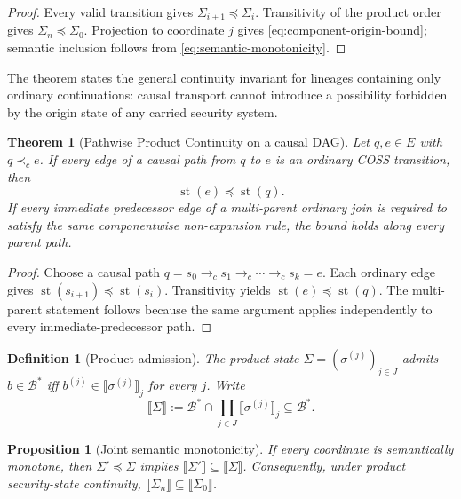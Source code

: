 \documentclass[10pt,twocolumn]{article}
\newcommand{\Model}{\textnormal{\textsc{COSS}}\xspace}
\newcommand{\sem}[1]{\llbracket #1 \rrbracket}
\newcommand{\state}{\Sigma}
\newcommand{\coord}{\sigma}
\newcommand{\st}{\operatorname{st}}
\newcommand{\hb}{\prec_{c}}
\newtheorem{definition}{Definition}
\newtheorem{theorem}{Theorem}
\newtheorem{proposition}{Proposition}
\begin{document}
\begin{proof}
Every valid transition gives
$\state_{i+1}\preceq\state_i$.  Transitivity of the product order gives
$\state_n\preceq\state_0$.  Projection to coordinate $j$ gives
\eqref{eq:component-origin-bound}; semantic inclusion follows from
\eqref{eq:semantic-monotonicity}.
\end{proof}

The theorem states the general continuity invariant for lineages containing
only ordinary continuations: causal transport cannot introduce a possibility
forbidden by the origin state of any carried security system.


\begin{theorem}[Pathwise Product Continuity on a causal DAG]
\label{thm:dag-continuity}
Let $q,e\in E$ with $q\hb e$. If every edge of a causal path from $q$ to $e$
is an ordinary \Model transition, then
\begin{equation}
  \st(e)\preceq \st(q).
\end{equation}
If every immediate predecessor edge of a multi-parent ordinary join is required
to satisfy the same componentwise non-expansion rule, the bound holds along
every parent path.
\end{theorem}

\begin{proof}
Choose a causal path
$q=s_0\to_c s_1\to_c\cdots\to_c s_k=e$. Each ordinary edge gives
$\st(s_{i+1})\preceq\st(s_i)$. Transitivity yields
$\st(e)\preceq\st(q)$. The multi-parent statement follows because the same
argument applies independently to every immediate-predecessor path.
\end{proof}

\begin{definition}[Product admission]\label{def:product-admission}
The product state $\state=(\coord^{(j)})_{j\in J}$ admits
$b\in\mathcal{B}^*$ iff $b^{(j)}\in\sem{\coord^{(j)}}_j$ for every $j$.
Write
\begin{equation}
  \sem{\state}:=
  \mathcal B^*\cap\prod_{j\in J}\sem{\coord^{(j)}}_j
  \subseteq\mathcal{B}^*.
\end{equation}
\end{definition}

\begin{proposition}[Joint semantic monotonicity]\label{prop:joint}
If every coordinate is semantically monotone, then
$\state'\preceq\state$ implies $\sem{\state'}\subseteq\sem{\state}$.
Consequently, under product security-state continuity,
$\sem{\state_n}\subseteq\sem{\state_0}$.
\end{proposition}
\end{document}
